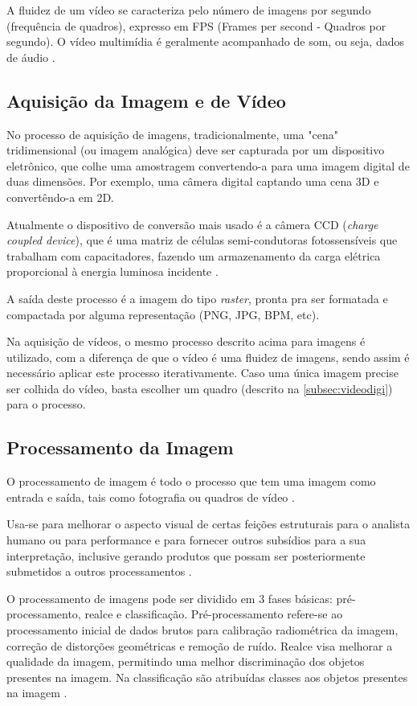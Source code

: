  A fluidez de um vídeo se caracteriza pelo número de imagens por segundo (frequência de quadros), expresso em FPS (Frames per second - Quadros por segundo). O vídeo multimídia é geralmente acompanhado de som, ou seja, dados de áudio \cite{ccm_video_digi}.

\subsection{Aquisição da Imagem e de Vídeo}\label{subsec:aquisicao_video}

No processo de aquisição de imagens, tradicionalmente, uma "cena" tridimensional (ou imagem analógica) deve ser capturada por um dispositivo eletrônico, que colhe uma amostragem convertendo-a para uma imagem digital de duas dimensões. Por exemplo, uma câmera digital captando uma cena 3D e convertêndo-a em 2D.

Atualmente o dispositivo de conversão mais usado  é a câmera CCD (\textit{charge coupled device}), que é uma matriz de células semi-condutoras fotossensíveis que trabalham com capacitadores, fazendo um armazenamento da carga elétrica proporcional à energia luminosa incidente \cite{gonzalez_woods}.

A saída deste processo é a imagem do tipo \textit{raster}, pronta pra ser formatada e compactada por alguma representação (PNG, JPG, BPM, etc). 


Na aquisição de vídeos, o mesmo processo descrito acima para imagens é utilizado, com a diferença de que o vídeo é uma fluidez de imagens, sendo assim é necessário aplicar este processo iterativamente. Caso uma única imagem precise ser colhida do vídeo, basta escolher um quadro (descrito na \autoref{subsec:videodigi}) para o processo.

\subsection{Processamento da Imagem}\label{subsec:processamento}

O processamento de imagem é todo o processo que tem uma imagem como entrada e saída, tais como fotografia ou quadros de vídeo .

Usa-se para melhorar o aspecto visual de certas feições estruturais para o analista humano ou para performance e para fornecer outros subsídios para a sua interpretação, inclusive gerando produtos que possam ser posteriormente submetidos a outros processamentos \cite{inpe_proc_img}.

O processamento de imagens pode ser dividido em 3 fases básicas: pré-processamento, realce e classificação.
Pré-processamento refere-se ao processamento inicial de dados brutos para calibração radiométrica da imagem, correção de distorções geométricas e remoção de ruído.
Realce visa melhorar a qualidade da imagem, permitindo uma melhor discriminação dos objetos presentes na imagem. Na classificação são atribuídas classes aos objetos presentes na imagem \cite{inpe_proc_img}.

